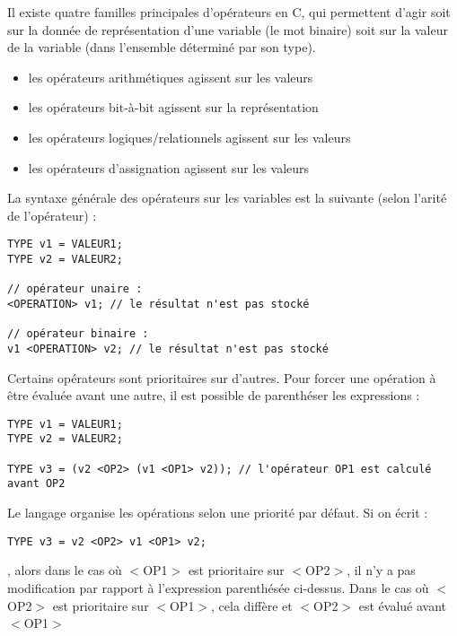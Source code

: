 \documentclass[../../../main.tex]{subfiles}
\begin{document}

Il existe quatre familles principales d'opérateurs en C, qui permettent d'agir soit sur la donnée de représentation d'une variable (le mot binaire) soit sur la valeur de la variable (dans l'ensemble déterminé par son type).
\begin{itemize}
	\item les opérateurs arithmétiques agissent sur les valeurs
	\item les opérateurs bit-à-bit agissent sur la représentation
	\item les opérateurs logiques/relationnels agissent sur les valeurs
	\item les opérateurs d'assignation agissent sur les valeurs
\end{itemize}
La syntaxe générale des opérateurs sur les variables est la suivante (selon l'arité de l'opérateur) :
\begin{verbatim}
TYPE v1 = VALEUR1;
TYPE v2 = VALEUR2;

// opérateur unaire :
<OPERATION> v1; // le résultat n'est pas stocké

// opérateur binaire :
v1 <OPERATION> v2; // le résultat n'est pas stocké
\end{verbatim}
Certains opérateurs sont prioritaires sur d'autres. Pour forcer une opération à être évaluée avant une autre, il est possible de parenthéser les expressions :
\begin{verbatim}
TYPE v1 = VALEUR1;
TYPE v2 = VALEUR2;

TYPE v3 = (v2 <OP2> (v1 <OP1> v2)); // l'opérateur OP1 est calculé avant OP2
\end{verbatim}
Le langage organise les opérations selon une priorité par défaut. Si on écrit :
\begin{verbatim}
TYPE v3 = v2 <OP2> v1 <OP1> v2;
\end{verbatim}
, alors dans le cas où \textsf{$<$OP1$>$} est prioritaire sur \textsf{$<$OP2$>$}, il n'y a pas modification par rapport à l'expression parenthésée ci-dessus. Dans le cas où \textsf{$<$OP2$>$} est prioritaire sur \textsf{$<$OP1$>$}, cela diffère et \textsf{$<$OP2$>$} est évalué avant \textsf{$<$OP1$>$}
 
\end{document}
